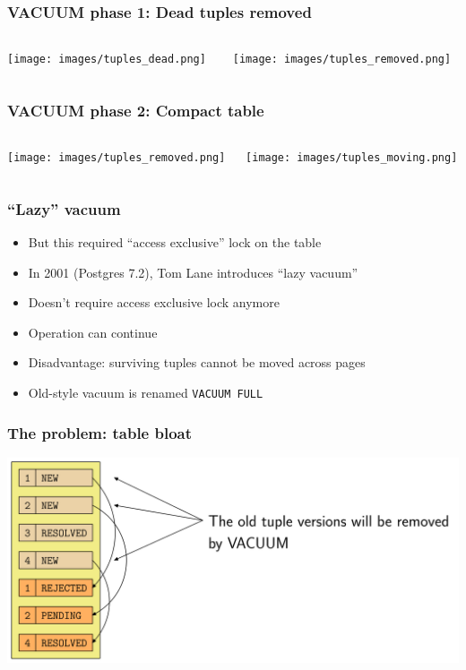 \begin{frame}
  \frametitle{VACUUM phase 1: Dead tuples removed}
  \begin{columns}
    \begin{column}{0.5\textwidth}
      \texttt{[image: images/tuples\_dead.png]}
    \end{column}
    \begin{column}{0.8\textwidth}
      \texttt{[image: images/tuples\_removed.png]}
    \end{column}
  \end{columns}
\end{frame}

\begin{frame}
  \frametitle{VACUUM phase 2: Compact table}
  \begin{columns}
    \begin{column}{0.5\textwidth}
      \texttt{[image: images/tuples\_removed.png]}

    \end{column}
    \begin{column}{0.8\textwidth}
      \texttt{[image: images/tuples\_moving.png]}
    \end{column}
  \end{columns}
\end{frame}

\begin{frame}
  \frametitle{``Lazy'' vacuum}
  \begin{itemize}
    \item But this required ``access exclusive'' lock on the table
    \item In 2001 (Postgres 7.2), Tom Lane introduces ``lazy vacuum''
    \item Doesn't require access exclusive lock anymore
    \item Operation can continue
    \item Disadvantage: surviving tuples cannot be moved across pages
    \item Old-style vacuum is renamed \texttt{VACUUM FULL}
  \end{itemize}
\end{frame}



\begin{frame}
  \frametitle{The problem: table bloat}
  \includegraphics[height=\sizeforimages\textheight]{images/bloat_01.png}
\end{frame}

